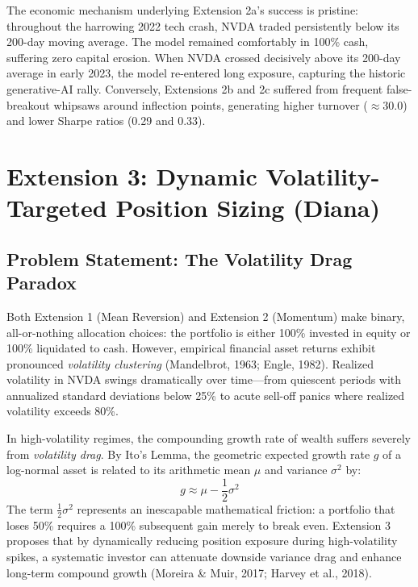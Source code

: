 \documentclass[12pt, a4paper]{article}
\begin{document}
The economic mechanism underlying Extension 2a's success is pristine: throughout the harrowing 2022 tech crash, NVDA traded persistently below its 200-day moving average. The model remained comfortably in 100\% cash, suffering zero capital erosion. When NVDA crossed decisively above its 200-day average in early 2023, the model re-entered long exposure, capturing the historic generative-AI rally. Conversely, Extensions 2b and 2c suffered from frequent false-breakout whipsaws around inflection points, generating higher turnover ($\approx 30.0$) and lower Sharpe ratios (0.29 and 0.33).


\section{Extension 3: Dynamic Volatility-Targeted Position Sizing (Diana)}
\subsection{Problem Statement: The Volatility Drag Paradox}
Both Extension 1 (Mean Reversion) and Extension 2 (Momentum) make binary, all-or-nothing allocation choices: the portfolio is either 100\% invested in equity or 100\% liquidated to cash. However, empirical financial asset returns exhibit pronounced \textit{volatility clustering} (Mandelbrot, 1963; Engle, 1982). Realized volatility in NVDA swings dramatically over time---from quiescent periods with annualized standard deviations below 25\% to acute sell-off panics where realized volatility exceeds 80\%.

In high-volatility regimes, the compounding growth rate of wealth suffers severely from \textit{volatility drag}. By Ito's Lemma, the geometric expected growth rate $g$ of a log-normal asset is related to its arithmetic mean $\mu$ and variance $\sigma^2$ by:
\begin{equation}
g \approx \mu - \frac{1}{2}\sigma^2
\end{equation}
The term $\frac{1}{2}\sigma^2$ represents an inescapable mathematical friction: a portfolio that loses 50\% requires a 100\% subsequent gain merely to break even. Extension 3 proposes that by dynamically reducing position exposure during high-volatility spikes, a systematic investor can attenuate downside variance drag and enhance long-term compound growth (Moreira \& Muir, 2017; Harvey et al., 2018).
\end{document}
